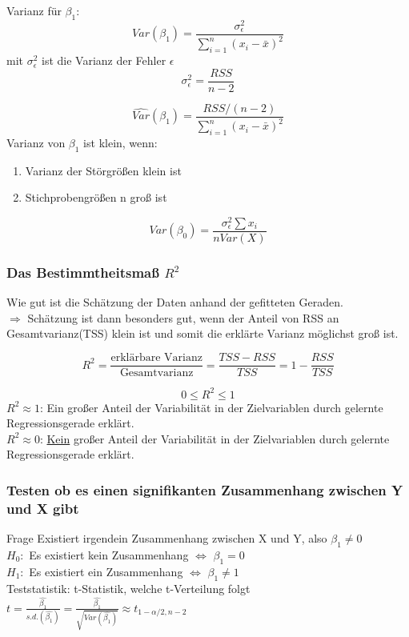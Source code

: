Varianz für $\beta_1$:
\[ 
	Var(\beta_1)= \frac{\sigma_{\epsilon}^2}{\sum\limits_{i=1}^n (x_i-\bar{x})^2} 
\]
mit $\sigma_{\epsilon}^2$ ist die Varianz der Fehler $\epsilon$
\[\sigma_{\epsilon}^2 = \frac{RSS}{n-2} \]

\[\widehat{Var}(\beta_1)=\frac{RSS/(n-2)}{\sum\limits_{i=1}^n (x_i-\bar{x})^2} \]
Varianz von $\beta_1$ ist klein, wenn:
\begin{enumerate}
	\item Varianz der Störgrößen klein ist
	\item Stichprobengrößen n groß ist
\end{enumerate}
\[Var(\beta_0) = \frac{\sigma_\epsilon^2  \sum x_i}{n Var(X)}\]

\subsubsection{Das Bestimmtheitsmaß $R^2$}
Wie gut ist die Schätzung der Daten anhand der gefitteten Geraden. \\
$\Rightarrow$ Schätzung ist dann besonders gut, wenn der Anteil von RSS an Gesamtvarianz(TSS) klein ist und somit die erklärte Varianz möglichst groß ist.

\[ R^2= \frac{\text{erklärbare Varianz}}{\text{Gesamtvarianz}}
= \frac{TSS-RSS}{TSS} = 1 - \frac{RSS}{TSS}\]

\[ 0 \leq R^2 \leq 1\]
$R^2 \approx 1$: Ein großer Anteil der Variabilität in der Zielvariablen durch gelernte Regressionsgerade erklärt. \\
$R^2 \approx 0$: \underline{Kein} großer Anteil der Variabilität in der Zielvariablen durch gelernte Regressionsgerade erklärt.

\subsubsection{Testen ob es einen signifikanten Zusammenhang zwischen Y und X gibt}
Frage Existiert irgendein Zusammenhang zwischen X und Y, also $\beta_1 \neq 0$\\
$H_0:$ Es existiert kein Zusammenhang $ \Leftrightarrow $ $ \beta_1 = 0$\\
$H_1:$ Es existiert ein Zusammenhang $ \Leftrightarrow $ $\beta_1 \neq 1$\\

Teststatistik: t-Statistik, welche t-Verteilung folgt $t= \frac{\hat{\beta_1}}{s.d.(\hat{\beta_1})} = \frac{\hat{\beta_1}}{\sqrt{Var(\hat{\beta_1})}} \approx t_{1-\alpha/2, n-2}$

